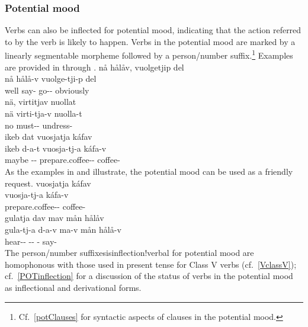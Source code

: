 \subsubsection{Potential mood}\label{POTmood}
Verbs can also be inflected for potential mood, indicating that the action referred to by the verb is likely to happen. Verbs in the potential mood are marked by a linearly segmentable morpheme  followed by a person/number suffix.\footnote{Cf.~\SEC\ref{potClauses} for syntactic aspects of clauses in the potential mood.} 
Examples are provided in  through .
\ea\label{potentialEx1}
\glll	nå hålåv, vuolgetjip del\\
	nå hålå-v vuolge-tji-p del\\
	well say- go-- obviously\\\nopagebreak
{}	
\z
\ea\label{potentialEx2}
\glll	nä, virtitjav nuollat\\
	nä virti-tja-v nuolla-t\\
	no must-- undress-\\\nopagebreak
{}	
\z
\ea\label{potentialEx3}
\glll	ikeb dat vuosjatja káfav\\
	ikeb d-a-t vuosja-tj-a káfa-v\\
	maybe -- prepare.coffee-- coffee-\\\nopagebreak
{}	
\z
As the examples in  and  illustrate, the potential mood can be used as a friendly request. 
\ea\label{potentialEx4}%
\glll	vuosjatja káfav\\
	vuosja-tj-a káfa-v\\
	prepare.coffee-- coffee-\\\nopagebreak
{}	
\z
\ea\label{potentialEx5}%
\glll	gulatja dav mav mån hålåv\\
	gula-tj-a d-a-v ma-v mån hålå-v\\
	hear-- -- -  say-\\\nopagebreak
{}	
\z
The person/number suffixesis{inflection!verbal} for potential mood are homophonous %
with those used in present tense for Class V verbs (cf.~\SEC\ref{VclassV}); cf.~\SEC\ref{POTinflection} for a discussion of the status of verbs in the potential mood as inflectional and derivational forms. 


